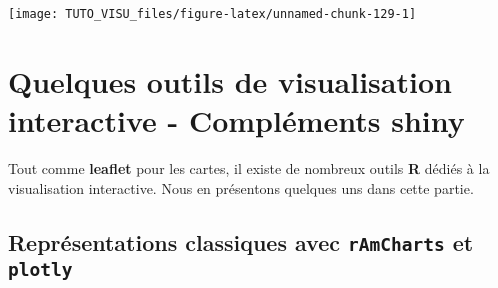 \documentclass[]{book}
\newenvironment{Shaded}{\begin{snugshade}}{\end{snugshade}}
\newcommand{\DataTypeTok}[1]{\textcolor[rgb]{0.13,0.29,0.53}{#1}}
\newcommand{\DecValTok}[1]{\textcolor[rgb]{0.00,0.00,0.81}{#1}}
\newcommand{\FloatTok}[1]{\textcolor[rgb]{0.00,0.00,0.81}{#1}}
\newcommand{\KeywordTok}[1]{\textcolor[rgb]{0.13,0.29,0.53}{\textbf{#1}}}
\newcommand{\NormalTok}[1]{#1}
\newcommand{\OperatorTok}[1]{\textcolor[rgb]{0.81,0.36,0.00}{\textbf{#1}}}
\newcommand{\OtherTok}[1]{\textcolor[rgb]{0.56,0.35,0.01}{#1}}
\newcommand{\StringTok}[1]{\textcolor[rgb]{0.31,0.60,0.02}{#1}}
\theoremstyle{definition}
\theoremstyle{definition}
\theoremstyle{definition}
\theoremstyle{remark}
\begin{document}
\begin{Shaded}
\end{Shaded}

\begin{center}\texttt{[image: TUTO\_VISU\_files/figure-latex/unnamed-chunk-129-1]} \end{center}

\hypertarget{quelques-outils-de-visualisation-interactive---compluxe9ments-shiny}{%
\chapter{Quelques outils de visualisation interactive - Compléments shiny}\label{quelques-outils-de-visualisation-interactive---compluxe9ments-shiny}}

Tout comme \textbf{leaflet} pour les cartes, il existe de nombreux outils \textbf{R} dédiés à la visualisation interactive. Nous en présentons quelques uns dans cette partie.

\hypertarget{repruxe9sentations-classiques-avec-ramcharts-et-plotly}{%
\section{\texorpdfstring{Représentations classiques avec \texttt{rAmCharts} et \texttt{plotly}}{Représentations classiques avec rAmCharts et plotly}}\label{repruxe9sentations-classiques-avec-ramcharts-et-plotly}}
\end{document}
